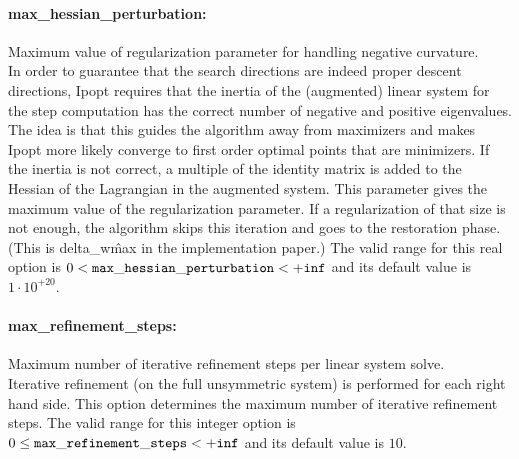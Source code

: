 \paragraph{max\_hessian\_perturbation:}\label{sec:max_hessian_perturbation} Maximum value of regularization parameter for handling negative curvature. $\;$ \\
 In order to guarantee that the search directions
are indeed proper descent directions, Ipopt
requires that the inertia of the (augmented)
linear system for the step computation has the
correct number of negative and positive
eigenvalues. The idea is that this guides the
algorithm away from maximizers and makes Ipopt
more likely converge to first order optimal
points that are minimizers. If the inertia is not
correct, a multiple of the identity matrix is
added to the Hessian of the Lagrangian in the
augmented system. This parameter gives the
maximum value of the regularization parameter. If
a regularization of that size is not enough, the
algorithm skips this iteration and goes to the
restoration phase. (This is delta\_w\^max in the
implementation paper.) The valid range for this real option is 
$0 <  {\tt max\_hessian\_perturbation } <  {\tt +inf}$
and its default value is $1 \cdot 10^{+20}$.


\paragraph{max\_refinement\_steps:}\label{sec:max_refinement_steps} Maximum number of iterative refinement steps per linear system solve. $\;$ \\
 Iterative refinement (on the full unsymmetric
system) is performed for each right hand side. 
This option determines the maximum number of
iterative refinement steps. The valid range for this integer option is
$0 \le {\tt max\_refinement\_steps } <  {\tt +inf}$
and its default value is $10$.


